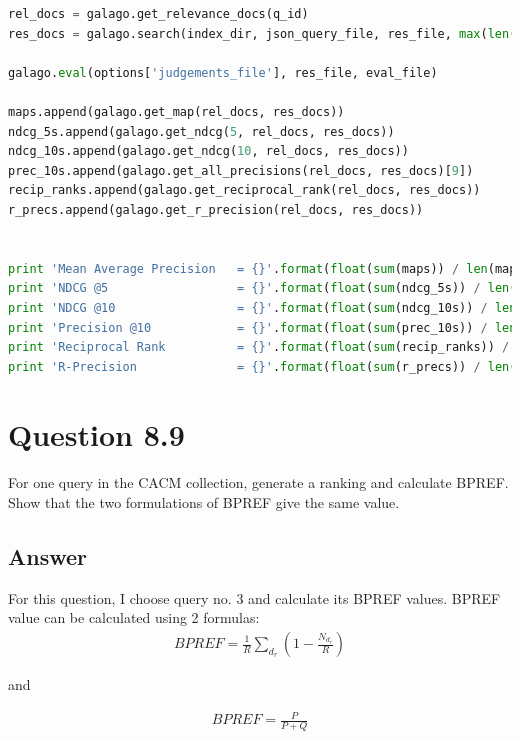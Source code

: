 \documentclass[letterpaper,11pt]{article}
\begin{document}
\begin{lstlisting}[language=python, caption={Script for calculating R-precision}, label={lst:87}]
rel_docs = galago.get_relevance_docs(q_id)
res_docs = galago.search(index_dir, json_query_file, res_file, max(len(rel_docs), int(options['result_count'])))

galago.eval(options['judgements_file'], res_file, eval_file)

maps.append(galago.get_map(rel_docs, res_docs))
ndcg_5s.append(galago.get_ndcg(5, rel_docs, res_docs))
ndcg_10s.append(galago.get_ndcg(10, rel_docs, res_docs))
prec_10s.append(galago.get_all_precisions(rel_docs, res_docs)[9])
recip_ranks.append(galago.get_reciprocal_rank(rel_docs, res_docs))
r_precs.append(galago.get_r_precision(rel_docs, res_docs))


print 'Mean Average Precision   = {}'.format(float(sum(maps)) / len(maps))
print 'NDCG @5                  = {}'.format(float(sum(ndcg_5s)) / len(ndcg_5s))
print 'NDCG @10                 = {}'.format(float(sum(ndcg_10s)) / len(ndcg_10s))
print 'Precision @10            = {}'.format(float(sum(prec_10s)) / len(prec_10s))
print 'Reciprocal Rank          = {}'.format(float(sum(recip_ranks)) / len(recip_ranks))
print 'R-Precision              = {}'.format(float(sum(r_precs)) / len(r_precs))


\end{lstlisting}


\noindent\makebox[\linewidth]{\rule{\textwidth}{0.4pt}}

\section*{Question 8.9}
\begin{spverbatim}
For one query in the CACM collection, generate a ranking and calculate
BPREF. Show that the two formulations of BPREF give the same value.
\end{spverbatim}

\subsection*{Answer}
For this question, I choose query no. 3 and calculate its BPREF values. BPREF value can be calculated using 2 formulas:
\begin{align}
BPREF = \frac{1}{R} \sum_{d_r}(1 - \frac{N_{d_r}}{R})
\end{align}

and 

\begin{align}
BPREF = \frac{P}{P + Q}
\end{align}
\end{document}
